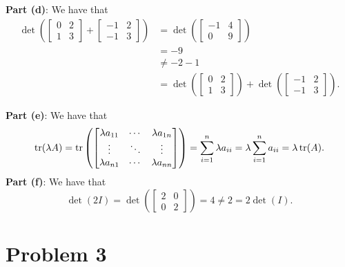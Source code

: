 \documentclass[11pt]{article}
\begin{document}
\textbf{Part (d)}: We have that
\begin{align*}
	\det \left( \begin{bmatrix} 0 & 2 \\ 1 & 3 \end{bmatrix} + \begin{bmatrix} -1 & 2 \\ -1 & 3 \end{bmatrix} \right) &= \det \left( \begin{bmatrix} -1 & 4 \\ 0 & 9 \end{bmatrix} \right) \\
	&= -9 \\
	&\ne -2 - 1 \\
	&= \det \left( \begin{bmatrix} 0 & 2 \\ 1 & 3 \end{bmatrix} \right) + \det \left( \begin{bmatrix} -1 & 2 \\ -1 & 3 \end{bmatrix} \right).
\end{align*}

\textbf{Part (e)}: We have that
\[
	\tr (\lambda A) = \tr \left( \begin{bmatrix} \lambda a_{11} & \cdots & \lambda a_{1n} \\ \vdots & \ddots & \vdots \\\lambda  a_{n1} & \cdots & \lambda a_{nn} \end{bmatrix} \right) = \sum_{i = 1}^{n} \lambda a_{ii} = \lambda \sum_{i = 1}^{n} a_{ii} = \lambda \tr(A).
\]
\textbf{Part (f)}: We have that
\[
	\det(2I) = \det \left( \begin{bmatrix} 2 & 0 \\ 0 & 2 \end{bmatrix} \right) = 4 \ne 2 = 2 \det(I).
\]


\section{Problem 3}
\end{document}
